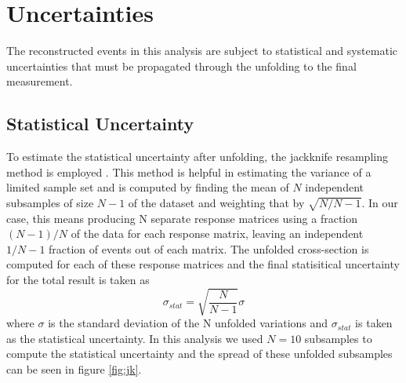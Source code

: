\section{Uncertainties}
The reconstructed events in this analysis are subject to statistical and systematic uncertainties that must be propagated through the unfolding to the final measurement.
\subsection{Statistical Uncertainty}
To estimate the statistical uncertainty after unfolding, the jackknife resampling method is employed \cite{economics_jk}. This method is helpful in estimating the variance of a limited sample set and is computed by finding the mean of $N$ independent subsamples of size $N-1$ of the dataset and weighting that by $\sqrt{N/N-1}$. In our case, this means producing N separate response matrices using a fraction $(N-1)/N$ of the data for each response matrix, leaving an independent $1/N-1$ fraction of events out of each matrix. The unfolded cross-section is computed for each of these response matrices and the final statisitical uncertainty for the total result is taken as
\begin{equation}
  \label{eq:jk}
  \sigma_{stat} = \sqrt{\frac{N}{N-1}}\sigma
\end{equation}
where $\sigma$ is the standard deviation of the N unfolded variations and $\sigma_{stat}$ is taken as the statistical uncertainty. In this analysis we used $N=10$ subsamples to compute the statistical uncertainty and the spread of these unfolded subsamples can be seen in figure \ref{fig:jk}.

